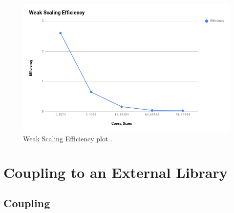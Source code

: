 \documentclass{article}
\begin{document}
\begin{spacing}{1.1}
\begin{center}
	\begin{figure}[H]
	\centering
       \includegraphics[scale=.40]{weakscaling.png}
        \caption{\label{weakscaling} Weak Scaling Efficiency plot .} 
	\end{figure}
\end{center}

\section{Coupling to an External Library}

\subsection{Coupling}


\end{spacing}
\end{document}
